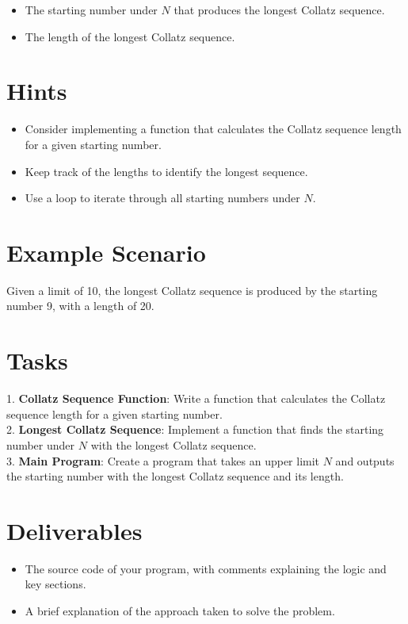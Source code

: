 \documentclass{article}
\begin{document}
\begin{itemize}
    \item The starting number under \(N\) that produces the longest Collatz sequence.
    \item The length of the longest Collatz sequence.
  \end{itemize}



\section*{Hints}
\begin{itemize}
\item Consider implementing a function that calculates the Collatz sequence length for a given starting number.
\item Keep track of the lengths to identify the longest sequence.
\item Use a loop to iterate through all starting numbers under \(N\).
\end{itemize}

\section*{Example Scenario}
Given a limit of 10, the longest Collatz sequence is produced by the starting number 9, with a length of 20.

\section*{Tasks}
1. \textbf{Collatz Sequence Function}: Write a function that calculates the Collatz sequence length for a given starting number.\\
2. \textbf{Longest Collatz Sequence}: Implement a function that finds the starting number under \(N\) with the longest Collatz sequence.\\
3. \textbf{Main Program}: Create a program that takes an upper limit \(N\) and outputs the starting number with the longest Collatz sequence and its length.

\section*{Deliverables}
\begin{itemize}
    \item The source code of your program, with comments explaining the logic and key sections.
    \item A brief explanation of the approach taken to solve the problem.
\end{itemize}
\end{document}
